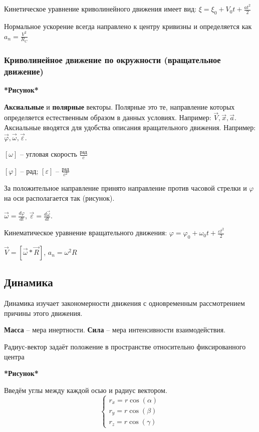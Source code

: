 \documentclass[a4paper,oneside]{article}
\theoremstyle{definition}
\theoremstyle{definition}
\theoremstyle{definition}
\newcommand{\tbf}[1]{\textbf{#1}}
\begin{document}
Кинетическое уравнение криволинейного движения имеет вид: $\xi = \xi_0 + V_0t + \frac {at^2}{2}$

Нормальное ускорение всегда направлено к центру кривизны и определяется как $a_n = \frac {V^2}{R_C}$

\subsubsection{Криволинейное движение по окружности (вращательное движение)}

\tbf{*Рисунок*}

\tbf{Аксиальные} и \tbf{полярные} векторы. Полярные это те, направление которых определяется естественным образом
в данных условиях. Например: $\vec{V}, \vec{x}, \vec{a}$. Аксиальные вводятся для удобства
описания вращательного движения. Например: $\vec{\varphi}, \vec{\omega}, \vec{\varepsilon}$.

$[ \omega ]$ -- угловая скорость $\frac{\text{рад}}{c}$

$[ \varphi ]$ -- $\text{рад}$; $[ \varepsilon ]$ -- $\frac{\text{рад}}{c^2}$

За положительное направление принято направление против часовой стрелки и $\varphi$ на оси 
располагается так (рисунок).

$\vec{\omega} = \frac {d\varphi}{dt}$, $\vec{\varepsilon} = \frac{d\vec{\omega}}{dt}$.

Кинематическое уравнение вращательного движения: $\varphi = \varphi_0 + \omega_0t + \frac {\varepsilon t^2}{2}$

$\vec{V} = [ \vec{\omega} * \vec{R} ]$, $a_n = \omega^2R$

\subsection{Динамика}
Динамика изучает закономерности движения с одновременным рассмотрением причины этого движения.

\tbf{Масса} -- мера инертности. \tbf{Сила} -- мера интенсивности взаимодействия.

Радиус-вектор задаёт положение в пространстве относительно фиксированного центра

\tbf{*Рисунок*}

Введём углы между каждой осью и радиус вектором.
\[
\begin{cases}
    {r_x} = r \cos(\alpha) \\
    {r_y} = r \cos(\beta) \\
    {r_z} = r \cos(\gamma)
\end{cases}
\]
\end{document}
